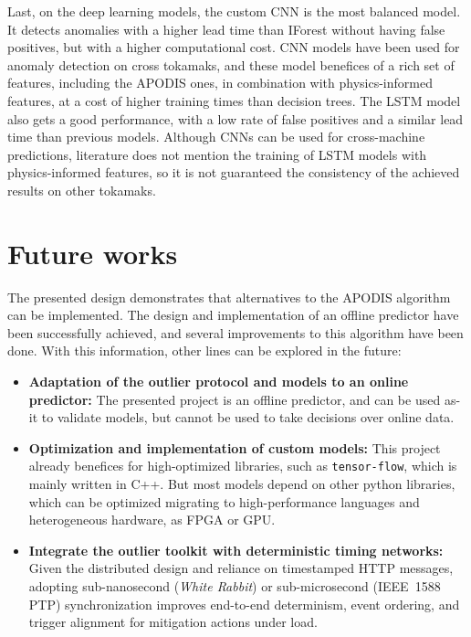 Last, on the deep learning models, the custom \ac{CNN} is the most balanced model. It detects anomalies with a higher lead time than \ac{IForest} without having false positives, but with a higher computational cost. \ac{CNN} models have been used for anomaly detection on cross tokamaks, and these model benefices of a rich set of features, including the \ac{APODIS} ones, in combination with physics-informed features, at a cost of higher training times than decision trees. The \ac{LSTM} model also gets a good performance, with a low rate of false positives and a similar lead time than previous models. Although \ac{CNN}s can be used for cross-machine predictions, literature does not mention the training of \ac{LSTM} models with physics-informed features, so it is not guaranteed the consistency of the achieved results on other tokamaks. 

\section{Future works}

The presented design demonstrates that alternatives to the \ac{APODIS} algorithm can be implemented. The design and implementation of an offline predictor have been successfully achieved, and several improvements to this algorithm have been done. With this information, other lines can be explored in the future:

\begin{itemize}
    \item \textbf{Adaptation of the outlier protocol and models to an online predictor:} The presented project is an offline predictor, and can be used as-it to validate models, but cannot be used to take decisions over online data.
    \item \textbf{Optimization and implementation of custom models:} This project already benefices for high-optimized libraries, such as \texttt{tensor-flow}, which is mainly written in C++. But most models depend on other python libraries, which can be optimized migrating to high-performance languages and heterogeneous hardware, as \ac{FPGA} or \ac{GPU}.
    \item \textbf{Integrate the outlier toolkit with deterministic timing networks:} Given the distributed design and reliance on timestamped HTTP messages, adopting sub-nanosecond (\emph{White Rabbit}) or sub-microsecond (IEEE~1588 \ac{PTP}) synchronization improves end-to-end determinism, event ordering, and trigger alignment for mitigation actions under load.

\end{itemize}


